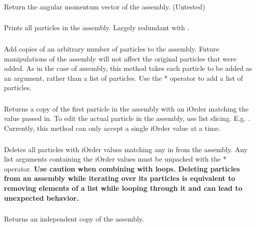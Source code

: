 \subsubsection{}
Return the angular momentum vector of the assembly. (Untested)

\subsubsection{}
Prints all particles in the assembly. Largely redundant with .

\subsubsection{}
Add copies of an arbitrary number of particles to the assembly. Future manipulations of the assembly will not affect the original particles that were added. As in the case of assembly, this method takes each particle to be added as an argument, rather than a list of particles. Use the * operator to add a list of particles.

\subsubsection{}
Returns a copy of the first particle in the assembly with an iOrder matching the value passed in. To edit the actual particle in the assembly, use list slicing. E.g. . Currently, this method can only accept a single iOrder value at a time.

\subsubsection{}
Deletes all particles with iOrder values matching any in  from the assembly. Any list arguments containing the iOrder values must be unpacked with the * operator. \textbf{Use caution when combining  with loops. Deleting particles from an assembly while iterating over its particles is equivalent to removing elements of a list while looping through it and can lead to unexpected behavior.}

\subsubsection{}
Returns an independent copy of the assembly.

